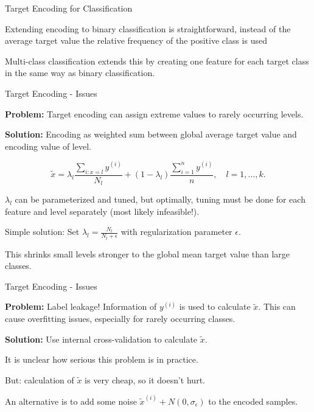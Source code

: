 
\begin{vbframe}{Target Encoding for Classification}

Extending encoding to binary classification is straightforward, instead of the average target value the relative frequency of the positive class is used

Multi-class classification extends this by creating one feature for each target class in the same way as binary classification.

\end{vbframe}


\begin{vbframe}{Target Encoding - Issues}

\textbf{Problem:} Target encoding can assign extreme values to rarely occurring levels.

\textbf{Solution:} Encoding as weighted sum between global average target value and encoding value of level.

$$\tilde x = \lambda_l\frac{\sum_{i:x=l}y^{(i)}}{N_l} + (1-\lambda_l)\frac{\sum_{i=1}^n y^{(i)}}{n}, \quad l=1,\dots,k.$$

$\lambda_l$ can be parameterized and tuned, but optimally, tuning must be done for each feature and level separately (most likely infeasible!).

Simple solution: Set $\lambda_l=\frac{N_l}{N_l+\epsilon}$ with regularization parameter $\epsilon$.

This shrinks small levels stronger to the global mean target value than large classes.

\end{vbframe}


\begin{vbframe}{Target Encoding - Issues}

\textbf{Problem:} Label leakage! Information of $y^{(i)}$ is used to calculate $\tilde x$. This can cause overfitting issues, especially for rarely occurring classes.

\textbf{Solution:} Use internal cross-validation to calculate $\tilde x$.

It is unclear how serious this problem is in practice.

But: calculation of $\tilde x$ is very cheap, so it doesn't hurt.

An alternative is to add some noise $\tilde x^{(i)} + N(0,\sigma_\epsilon)$ to the encoded samples.

\end{vbframe}

\endlecture

